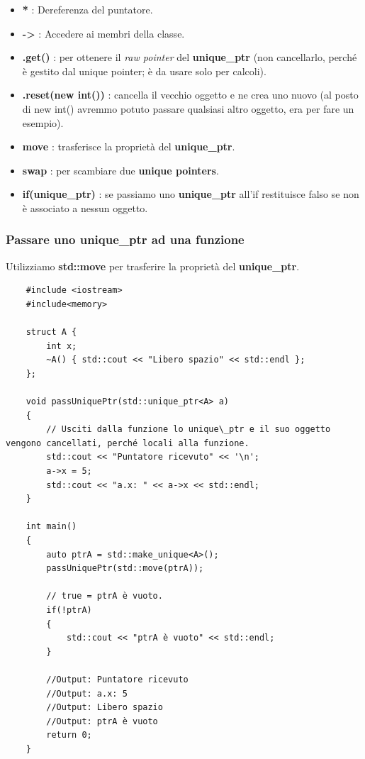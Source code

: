 \begin{itemize}
	\item \textsf{\small \textbf{*} : Dereferenza del puntatore.}
	\item \textsf{\small \textbf{->} : Accedere ai membri della classe.}
	\item \textsf{\small \textbf{.get()} : per ottenere il \emph{raw pointer} del \textbf{unique\_ptr} (non cancellarlo, perché è gestito dal unique pointer; è da usare solo per calcoli).}
	\item \textsf{\small \textbf{.reset(new int())} : cancella il vecchio oggetto e ne crea uno nuovo (al posto di new int() avremmo potuto passare qualsiasi altro oggetto, era per fare un esempio).}
	\item \textsf{\small \textbf{move} : trasferisce la proprietà del \textbf{unique\_ptr}.}
	\item \textsf{\small \textbf{swap} : per scambiare due \textbf{unique pointers}.}
	\item \textsf{\small \textbf{if(unique\_ptr)} : se passiamo uno \textbf{unique\_ptr} all'if restituisce falso se non è associato a nessun oggetto.}
\end{itemize}

\subsubsection{Passare uno unique\_ptr ad una funzione}

\textsf{\small Utilizziamo \textbf{std::move} per trasferire la proprietà del \textbf{unique\_ptr}.} \\

\begin{lstlisting}
	#include <iostream>
	#include<memory>
	
	struct A {
		int x;
		~A() { std::cout << "Libero spazio" << std::endl };
	};

	void passUniquePtr(std::unique_ptr<A> a)
	{
		// Usciti dalla funzione lo unique\_ptr e il suo oggetto vengono cancellati, perché locali alla funzione.
		std::cout << "Puntatore ricevuto" << '\n';
		a->x = 5;
		std::cout << "a.x: " << a->x << std::endl;
	}

	int main()
	{
		auto ptrA = std::make_unique<A>();
		passUniquePtr(std::move(ptrA));
		
		// true = ptrA è vuoto.
		if(!ptrA)
		{
			std::cout << "ptrA è vuoto" << std::endl;
		}
	
		//Output: Puntatore ricevuto
		//Output: a.x: 5
		//Output: Libero spazio
		//Output: ptrA è vuoto
		return 0;
	}
\end{lstlisting} 

